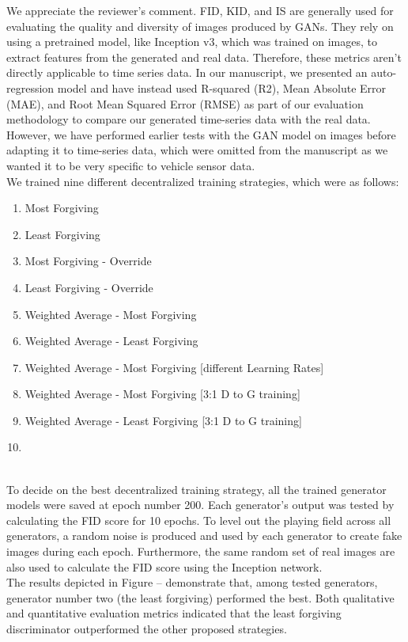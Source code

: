 \documentclass{article}
\begin{document}
\AR We appreciate the reviewer's comment. FID, KID, and IS are generally used for evaluating the quality and diversity of images produced by GANs. They rely on using a pretrained model, like Inception v3, which was trained on images, to extract features from the generated and real data. Therefore, these metrics aren't directly applicable to time series data. In our manuscript, we presented an auto-regression model and have instead used R-squared (R2), Mean Absolute Error (MAE), and Root Mean Squared Error (RMSE) as part of our evaluation methodology to compare our generated time-series data with the real data. However, we have performed earlier tests with the GAN model on images before adapting it to time-series data, which were omitted from the manuscript as we wanted it to be very specific to vehicle sensor data.
\\
We trained nine different decentralized training strategies, which were as follows: 
\setlength{\columnsep}{-3cm}
\begin{multicols}{2}[\small]
\begin{enumerate}
    \item Most Forgiving
    \item Least Forgiving
    \item Most Forgiving - Override
    \item Least Forgiving - Override
    \item Weighted Average - Most Forgiving
    \item Weighted Average - Least Forgiving
    \item Weighted Average - Most Forgiving [different Learning Rates]
    \item Weighted Average - Most Forgiving [3:1 D to G training]
    \item Weighted Average - Least Forgiving [3:1 D to G training]
    \item[]
\end{enumerate}
\end{multicols}
\\
To decide on the best decentralized training strategy, all the trained generator models were saved at epoch number 200. Each generator's output was tested by calculating the FID score for 10 epochs. To level out the playing field across all generators, a random noise is produced and used by each generator to create fake images during each epoch. Furthermore, the same random set of real images are also used to calculate the FID score using the Inception network.
\\
The results depicted in Figure -- demonstrate that, among tested generators, generator number two (the least forgiving) performed the best. Both qualitative and quantitative evaluation metrics indicated that the least forgiving discriminator outperformed the other proposed strategies.
\end{document}
